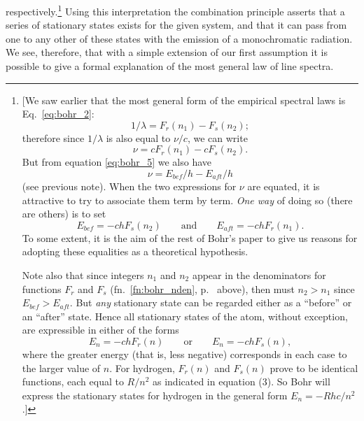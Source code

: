 respectively.\footnote{{[}We saw earlier that the most general form of
  the empirical spectral laws is Eq.~\eqref{eq:bohr_2}:
  \begin{equation*}
  1/\lambda = F_r(n_1) - F_s(n_2) ;
  \end{equation*}
  therefore since $1/\lambda$ is also equal to $\nu/c$, we can write
  \begin{equation*}
  \nu = cF_r(n_1) - cF_s(n_2) .
  \end{equation*}
  But from equation \eqref{eq:bohr_5} we also have
  \begin{equation*}
  \nu = E_{bef}/h - E_{aft}/h
  \end{equation*}
  (see previous note). When the two expressions for $\nu$ are
  equated, it is attractive to try to associate them term by term.
  \emph{One way} of doing so (there are others) is to set
  \begin{equation*}
  E_{bef} = - chF_s(n_2) \quad\quad \text{and} \quad\quad E_{aft} = -chF_r(n_1) .
  \end{equation*}
  To some extent, it is the aim of the rest of Bohr's paper to give us
  reasons for adopting these equalities as a theoretical hypothesis.

  Note also that since integers $n_1$ and $n_2$ appear in the
  denominators for functions $F_r$ and $F_s$ (fn.~\ref{fn:bohr_nden}, p.~\pageref{fn:bohr_nden}
  above), then must $n_2 > n_1$ since $E_{bef} > E_{aft}$. But \emph{any} 
  stationary state can be
  regarded either as a ``before'' or an ``after'' state. Hence all
  stationary states of the atom, without exception, are expressible in
  either of the forms
  \begin{equation*}
  E_n = -chF_r(n) \quad\quad \text{or} \quad\quad E_n = -chF_s(n) ,
  \end{equation*}
  where the greater energy (that is, less negative) corresponds in each
  case to the larger value of $n$. For hydrogen,
  $F_r(n)$ and $F_s(n)$ prove to be identical
  functions, each equal to $R/n^2$ as indicated in equation (3).
  So Bohr will express the stationary states for hydrogen
  in the general form $E_n = -Rhc/n^2$.{]}} Using this
interpretation the combination principle asserts that a series of
stationary states exists for the given system, and that it can pass from
one to any other of these states with the emission of a monochromatic
radiation. We see, therefore, that with a simple extension of our first
assumption it is possible to give a formal explanation of the most
general law of line spectra.

